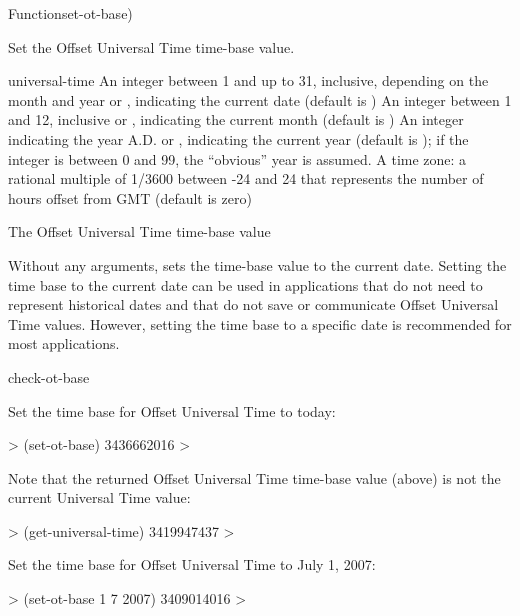 \documentclass[10pt,twoside,english,pdftex]{article}
\begin{document}
\begin{functiondoc}{Function}{set-ot-base}{)
    \returns{} }
%

\fnsyntax

\fnpurpose Set the Offset Universal Time time-base value.

\fnpackage {}

\fnmodule {}

\fnargs
\begin{args}{universal-time}
  \arg[date] An integer between 1 and up to 31, inclusive, depending
  on the month and year or \nil, indicating the current date (default is \nil)
  \arg[month] An integer between 1 and 12, inclusive or \nil, indicating the
  current month (default is \nil)
  \arg[year] An integer indicating the year A.D. or \nil, indicating the
  current year (default is \nil); if the 
  integer is between 0 and 99, the ``obvious'' year is assumed.
   A time zone: a rational multiple of 1/3600 between
  -24 and 24 that represents the number of hours offset from GMT 
  (default is zero)
\end{args}

\fnreturns The Offset Universal Time time-base value

\fndescription Without any arguments,  sets the
time-base value to the current date.  Setting the time base to the current
date can be used in applications that do not need to represent historical
dates and that do not save or communicate Offset Universal Time values.
However, setting the time base to a specific date is recommended for most
applications.

\begin{alsos}{check-ot-base}
\also[*ot-base*]
\also[ot2ut]
\also[ut2ot]
\end{alsos}

\fnexamples
Set the time base for Offset Universal Time to today:
%
\W\supp
\begin{example}
  > (set-ot-base)
  3436662016
  >
\end{example}
Note that the returned Offset Universal Time time-base value (above) is not
the current Universal Time value:
%
\W\supp\notpretop
\begin{example}
  > (get-universal-time)
  3419947437
  >
\end{example}

Set the time base for Offset Universal Time to July 1, 2007:
%
\W\supp
\begin{example}
  > (set-ot-base 1 7 2007)
  3409014016
  >
\end{example}

\end{functiondoc}
\end{document}
